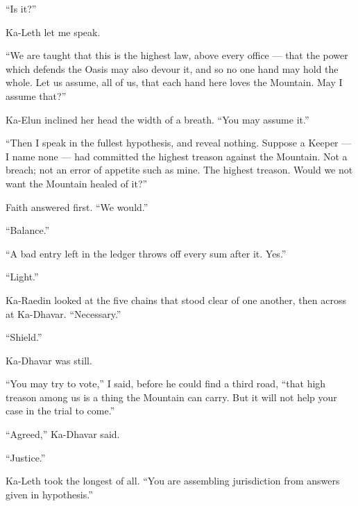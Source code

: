 ``Is it?''\par

Ka-Leth let me speak.\par

``We are taught that this is the highest law, above every office --- that the power which defends the Oasis may also devour it, and so no one hand may hold the whole. Let us assume, all of us, that each hand here loves the Mountain. May I assume that?''\par

Ka-Elun inclined her head the width of a breath. ``You may assume it.''\par

``Then I speak in the fullest hypothesis, and reveal nothing. Suppose a Keeper --- I name none --- had committed the highest treason against the Mountain. Not a breach; not an error of appetite such as mine. The highest treason. Would we not want the Mountain healed of it?''\par

Faith answered first. ``We would.''\par

``Balance.''\par

``A bad entry left in the ledger throws off every sum after it. Yes.''\par

``Light.''\par

Ka-Raedin looked at the five chains that stood clear of one another, then across at Ka-Dhavar. ``Necessary.''\par

``Shield.''\par

Ka-Dhavar was still.\par

``You may try to vote,'' I said, before he could find a third road, ``that high treason among us is a thing the Mountain can carry. But it will not help your case in the trial to come.''\par

``Agreed,'' Ka-Dhavar said.\par

``Justice.''\par

Ka-Leth took the longest of all. ``You are assembling jurisdiction from answers given in hypothesis.''\par

